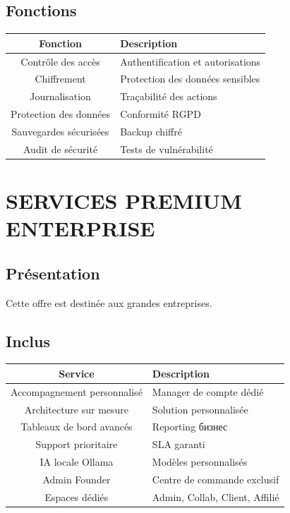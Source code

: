 \documentclass[12pt,a4paper,oneside]{book}
\begin{document}
\section{Fonctions}
\begin{center}
\begin{tabular}{|c|p{10cm}|}
\hline
\rowcolor{electroncyan}
\color{white}\textbf{Fonction} & \color{white}\textbf{Description} \\
\hline
Contrôle des accès & Authentification et autorisations \\
\hline
Chiffrement & Protection des données sensibles \\
\hline
Journalisation & Traçabilité des actions \\
\hline
Protection des données & Conformité RGPD \\
\hline
Sauvegardes sécurisées & Backup chiffré \\
\hline
Audit de sécurité & Tests de vulnérabilité \\
\hline
\end{tabular}
\end{center}

\chapter{SERVICES PREMIUM ENTERPRISE}

\section{Présentation}
Cette offre est destinée aux grandes entreprises.

\section{Inclus}
\begin{center}
\begin{tabular}{|c|p{10cm}|}
\hline
\rowcolor{electrongold}
\color{white}\textbf{Service} & \color{white}\textbf{Description} \\
\hline
Accompagnement personnalisé & Manager de compte dédié \\
\hline
Architecture sur mesure & Solution personnalisée \\
\hline
Tableaux de bord avancés & Reporting бизнес \\
\hline
Support prioritaire & SLA garanti \\
\hline
IA locale Ollama & Modèles personnalisés \\
\hline
Admin Founder & Centre de commande exclusif \\
\hline
Espaces dédiés & Admin, Collab, Client, Affilié \\
\hline
\end{tabular}
\end{center}
\end{document}
